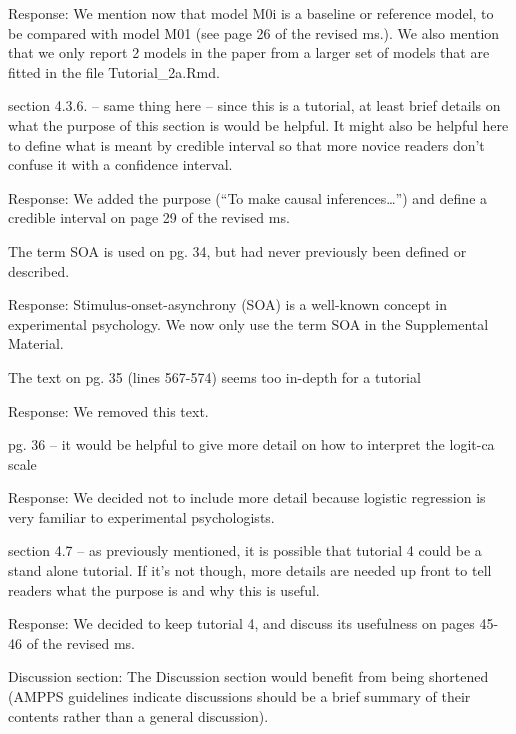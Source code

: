 \documentclass[
]{article}
\renewenvironment{quote}{\begin{leftbar}}{\end{leftbar}}
\begin{document}
Response: We mention now that model M0i is a baseline or reference
model, to be compared with model M01 (see page 26 of the revised ms.).
We also mention that we only report 2 models in the paper from a larger
set of models that are fitted in the file Tutorial\_2a.Rmd.

\begin{quote}
section 4.3.6. -- same thing here -- since this is a tutorial, at least
brief details on what the purpose of this section is would be helpful.
It might also be helpful here to define what is meant by credible
interval so that more novice readers don't confuse it with a confidence
interval.
\end{quote}

Response: We added the purpose (``To make causal inferences\ldots{}'')
and define a credible interval on page 29 of the revised ms.

\begin{quote}
The term SOA is used on pg. 34, but had never previously been defined or
described.
\end{quote}

Response: Stimulus-onset-asynchrony (SOA) is a well-known concept in
experimental psychology. We now only use the term SOA in the
Supplemental Material.

\begin{quote}
The text on pg. 35 (lines 567-574) seems too in-depth for a tutorial
\end{quote}

Response: We removed this text.

\begin{quote}
pg. 36 -- it would be helpful to give more detail on how to interpret
the logit-ca scale
\end{quote}

Response: We decided not to include more detail because logistic
regression is very familiar to experimental psychologists.

\begin{quote}
section 4.7 -- as previously mentioned, it is possible that tutorial 4
could be a stand alone tutorial. If it's not though, more details are
needed up front to tell readers what the purpose is and why this is
useful.
\end{quote}

Response: We decided to keep tutorial 4, and discuss its usefulness on
pages 45-46 of the revised ms.

\begin{quote}
Discussion section: The Discussion section would benefit from being
shortened (AMPPS guidelines indicate discussions should be a brief
summary of their contents rather than a general discussion).
\end{quote}
\end{document}
